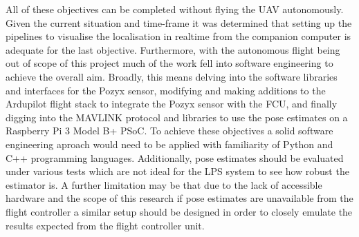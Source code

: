 All of these objectives can be completed without flying the UAV autonomously.
Given the current situation and time-frame it was determined that setting up the pipelines to visualise the localisation in realtime from the companion computer is adequate for the last objective.
Furthermore, with the autonomous flight being out of scope of this project much of the work fell into software engineering to achieve the overall aim.
Broadly, this means delving into the software libraries and interfaces for the Pozyx sensor, modifying and making additions to the Ardupilot flight stack to integrate the Pozyx sensor with the FCU,
and finally digging into the MAVLINK protocol and libraries to use the pose estimates on a Raspberry Pi 3 Model B+ PSoC.
To achieve these objectives a solid software engineering aproach would need to be applied with familiarity of Python and C++ programming languages.
Additionally, pose estimates should be evaluated under various tests which are not ideal for the LPS system to see how robust the estimator is.
A further limitation may be that due to the lack of accessible hardware and the scope of this research if pose estimates are unavailable from the flight controller a similar setup should be designed in order to closely emulate the results expected from the flight controller unit.


